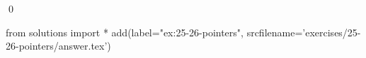 
\begin{ex}
  \label{ex:25-26-pointers}
  
  \qed
\end{ex}
\begin{python0}
from solutions import *
add(label="ex:25-26-pointers",
    srcfilename='exercises/25-26-pointers/answer.tex')
\end{python0}
